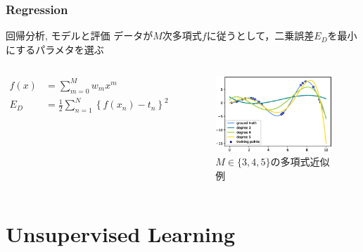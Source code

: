 \documentclass[dvipdfmx,platex]{beamer}
\begin{document}
\section{Regression}
\begin{frame}{回帰分析, モデルと評価}
  データが$M$次多項式$f$に従うとして，二乗誤差$E_D$を最小にするパラメタを選ぶ
  \begin{columns}[T,onlytextwidth]
    \begin{align*}
      f(x)&=\sum_{m=0}^{M}w_mx^{m}\\
      E_{D}&=\frac{1}{2}\sum_{n=1}^{N}{\left\{f(x_n)-t_n\right\}}^2
    \end{align*}
    \begin{figure}
      \centering
      \includegraphics[width=5cm]{fig/polyreg.eps}
      \caption{$M\in\{3,4,5\}${\mgfamily の多項式近似例}}
    \end{figure}
  \end{columns}
\end{frame}
\part{Unsupervised Learning}
\end{document}
